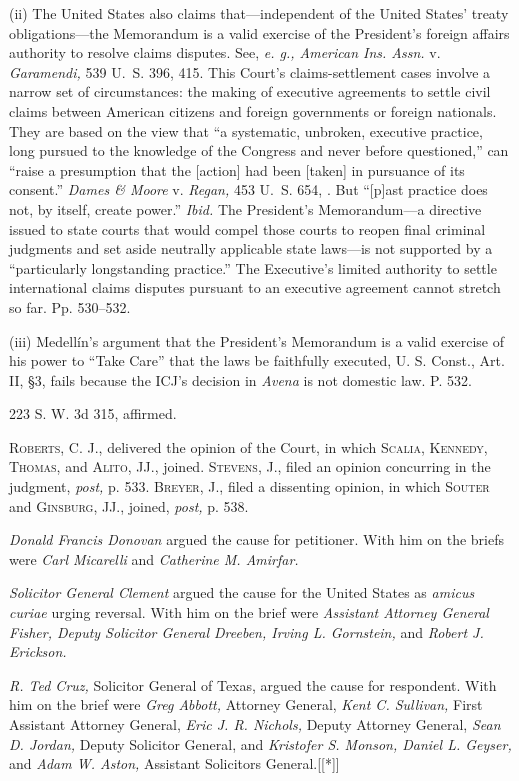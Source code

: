   (ii) The United States also claims that---independent of the United
States' treaty obligations---the Memorandum is a valid exercise of
the President's foreign affairs authority to resolve claims disputes.
See, \emph{e. g., American Ins. Assn.} v. \emph{Garamendi,} 539 U.~S. 396,
415. This Court's claims-settlement cases involve a narrow set
of circumstances: the making of executive agreements to settle civil
claims between American citizens and foreign governments or foreign
nationals. They are based on the view that ``a systematic, unbroken,
executive practice, long pursued to the knowledge of the Congress
and never before questioned,'' can ``raise a presumption that the
[action] had been [taken] in pursuance of its consent.'' \emph{Dames
\& Moore} v. \emph{Regan,} 453 U.~S. 654, . But ``[p]ast
practice does not, by itself, create power.'' \emph{Ibid.} The
President's Memorandum---a directive issued to state courts that would
compel those courts to reopen final criminal judgments and set aside
neutrally applicable state laws---is not supported by a ``particularly
longstanding practice.'' The Executive's limited authority to settle
international claims disputes pursuant to an executive agreement cannot
stretch so far. Pp. 530--532.

  (iii) Medellín's argument that the President's Memorandum is
a valid exercise of his power to ``Take Care'' that the laws be
faithfully executed, U. S. Const., Art. II, \S3, fails because the
ICJ's decision in \emph{Avena} is not domestic law. P. 532.

223 S. W. 3d 315, affirmed.

  \textsc{Roberts,} C. J., delivered the opinion of the Court, in which
\textsc{Scalia,} \textsc{Kennedy, Thomas,} and \textsc{Alito,} JJ., joined.
\textsc{Stevens,} J., filed an opinion concurring in the judgment, \emph{post,}
p. 533. \textsc{Breyer,} J., filed a dissenting opinion, in which \textsc{Souter}
and \textsc{Ginsburg, JJ.,} joined, \emph{post,} p. 538.

  \emph{Donald Francis Donovan} argued the cause for petitioner. With him
on the briefs were \emph{Carl Micarelli} and \emph{Catherine M. Amirfar.}

  \emph{Solicitor General Clement} argued the cause for the United States
as \emph{amicus curiae} urging reversal. With him on the brief were
\emph{Assistant Attorney General Fisher, Deputy Solicitor General Dreeben,
Irving L. Gornstein,} and \emph{Robert J. Erickson.}

  \emph{R. Ted Cruz,} Solicitor General of Texas, argued the cause for
respondent. With him on the brief were \emph{Greg Abbott,} Attorney
General, \emph{Kent C. Sullivan,} First Assistant Attorney General, \emph{Eric
J. R. Nichols,} Deputy Attorney General, \emph{Sean D. Jordan,} Deputy
Solicitor General, and \emph{Kristofer S. Monson, Daniel L. Geyser,} and
\emph{Adam W. Aston,} Assistant Solicitors General.[[*]]

